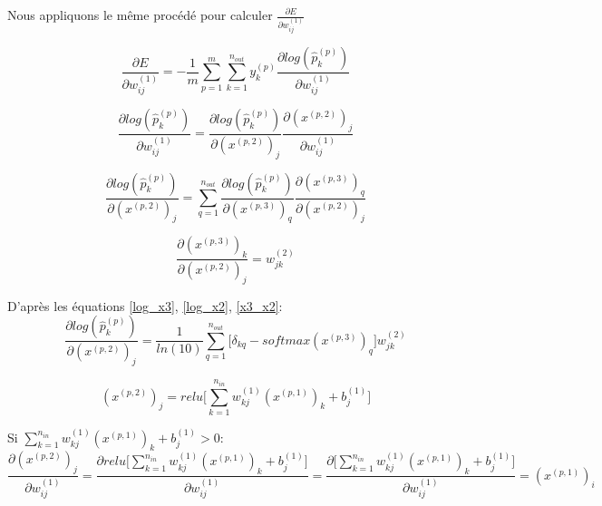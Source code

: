 \documentclass[a4paper,11pt,oneside,roman]{article}
\begin{document}
    Nous appliquons le même procédé pour calculer $\frac{\partial E}{\partial w_{ij}^{(1)}}$

    \begin{equation}
        \frac{\partial E}{\partial w_{ij}^{(1)}} = -\frac{1}{m} \sum\limits_{p=1}^{m} \sum\limits_{k=1}^{n_{out}} y_k^{(p)} \frac{\partial log(\hat{p}_{k}^{(p)})}{\partial w_{ij}^{(1)}}
        \label{E_wij1}
    \end{equation}

    \begin{equation}
        \frac{\partial log(\hat{p}_{k}^{(p)})}{\partial w_{ij}^{(1)}} = \frac{\partial log(\hat{p}_{k}^{(p)})}{\partial (x^{(p,2)})_j} \frac{\partial (x^{(p,2)})_j}{\partial w_{ij}^{(1)}}
        \label{log_wij}
    \end{equation}

    \begin{equation}
        \frac{\partial log(\hat{p}_{k}^{(p)})}{\partial (x^{(p,2)})_j} = \sum\limits_{q=1}^{n_{out}} \frac{\partial log(\hat{p}_{k}^{(p)})}{\partial (x^{(p,3)})_q} \frac{\partial (x^{(p,3)})_q}{\partial (x^{(p,2)})_j}
        \label{log_x2}
    \end{equation}
    
    \begin{equation}
        \frac{\partial (x^{(p,3)})_k}{\partial (x^{(p,2)})_j} = w_{jk}^{(2)}
        \label{x3_x2}
    \end{equation}
    
    D'après les équations \eqref{log_x3}, \eqref{log_x2}, \eqref{x3_x2}:
    \begin{equation}
        \frac{\partial log(\hat{p}_{k}^{(p)})}{\partial (x^{(p,2)})_j} = \frac{1}{ln(10)} \sum\limits_{q=1}^{n_{out}} \bigg[ \delta_{kq} - softmax(x^{(p,3)})_q \bigg] w_{jk}^{(2)}
        \label{log_x2_final}
    \end{equation}
    
    \begin{equation}
        (x^{(p,2)})_{j} = relu\bigg[\sum\limits_{k=1}^{n_{in}} w_{kj}^{(1)}(x^{(p,1)})_{k} + b_j^{(1)}\bigg]
    \end{equation}
    
    Si $\sum\limits_{k=1}^{n_{in}} w_{kj}^{(1)}(x^{(p,1)})_{k} + b_j^{(1)} > 0$:
    \begin{equation}
        \frac{\partial (x^{(p,2)})_j}{\partial w_{ij}^{(1)}} = \frac{\partial relu\bigg[\sum\limits_{k=1}^{n_{in}} w_{kj}^{(1)}(x^{(p,1)})_{k} + b_j^{(1)}\bigg]}{\partial w_{ij}^{(1)}} = \frac{\partial \bigg[\sum\limits_{k=1}^{n_{in}} w_{kj}^{(1)}(x^{(p,1)})_{k} + b_j^{(1)}\bigg]}{\partial w_{ij}^{(1)}} = (x^{(p,1)})_i
    \end{equation}
    
\end{document}
